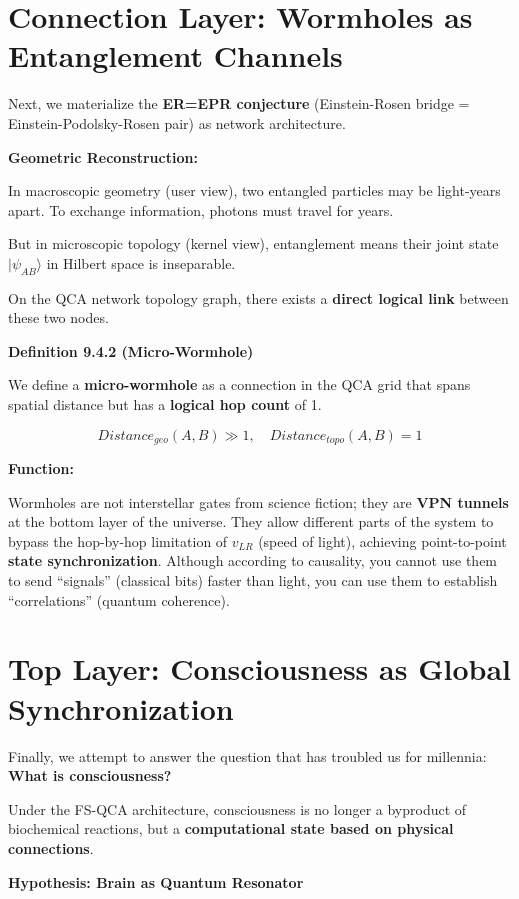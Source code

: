 \section{Connection Layer: Wormholes as Entanglement Channels}

Next, we materialize the \textbf{ER=EPR conjecture} (Einstein-Rosen bridge = Einstein-Podolsky-Rosen pair) as network architecture.

\textbf{Geometric Reconstruction:}

In macroscopic geometry (user view), two entangled particles may be light-years apart. To exchange information, photons must travel for years.

But in microscopic topology (kernel view), entanglement means their joint state $|\psi_{AB}\rangle$ in Hilbert space is inseparable.

On the QCA network topology graph, there exists a \textbf{direct logical link} between these two nodes.

\textbf{Definition 9.4.2 (Micro-Wormhole)}

We define a \textbf{micro-wormhole} as a connection in the QCA grid that spans spatial distance but has a \textbf{logical hop count} of 1.

$$Distance_{geo}(A, B) \gg 1, \quad Distance_{topo}(A, B) = 1$$

\textbf{Function:}

Wormholes are not interstellar gates from science fiction; they are \textbf{VPN tunnels} at the bottom layer of the universe. They allow different parts of the system to bypass the hop-by-hop limitation of $v_{LR}$ (speed of light), achieving point-to-point \textbf{state synchronization}. Although according to causality, you cannot use them to send ``signals'' (classical bits) faster than light, you can use them to establish ``correlations'' (quantum coherence).

\section{Top Layer: Consciousness as Global Synchronization}

Finally, we attempt to answer the question that has troubled us for millennia: \textbf{What is consciousness?}

Under the FS-QCA architecture, consciousness is no longer a byproduct of biochemical reactions, but a \textbf{computational state based on physical connections}.

\textbf{Hypothesis: Brain as Quantum Resonator}

